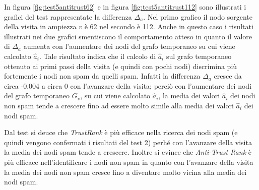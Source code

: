 In figura \ref{fig:test5antitrust62} e in figura \ref{fig:test5antitrust112} sono illustrati i grafici del test rappresentate la differenza \(\Delta_a\). Nel primo grafico il nodo sorgente della visita in ampiezza \(v\) è 62 nel secondo è 112. Anche in questo caso i risultati illustrati nei due grafici smentiscono il comportamento atteso in quanto il valore di \(\Delta_a\) aumenta con l'aumentare dei nodi del grafo temporaneo su cui viene calcolato \(\hat{a}_i\). Tale risultato indica che il calcolo di \(\hat{a}_i\) sul grafo temporaneo ottenuto ai primi passi della visita (e quindi con pochi nodi) discrimina più fortemente i nodi non spam da 
quelli spam. Infatti la differenza \(\Delta_a\) cresce da circa -0.004 a circa 0 con l'avanzare della visita; perciò con l'aumentare dei nodi del grafo temporaneo \(G_v\), su cui viene calcolato \(\hat{a}_i\), la media dei valori \(\hat{a}_i\) dei nodi non spam tende a crescere fino ad essere molto simile alla media dei valori \(\hat{a}_i\) dei nodi spam.

Dal test si deuce che \textit{TrustRank} è più efficace nella ricerca dei nodi spam (e quindi vengono confermati i risultati del test 2) perhé con l'avanzare della visita la media dei nodi spam tende a crescere. Inoltre si evince che \textit{Anti-Trust Rank} è più efficace nell'identificare i nodi non spam in quanto con l'avanzare della visita la media dei nodi non spam cresce fino a diventare molto vicina alla media dei nodi spam.



